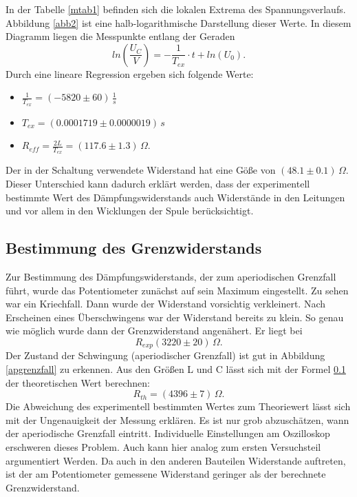 \documentclass[11pt,ngerman,a4paper]{article}
\begin{document}
In der Tabelle \ref{mtab1} befinden sich die lokalen Extrema des Spannungsverlaufs. Abbildung \ref{abb2} ist eine halb-logarithmische Darstellung dieser Werte. In diesem Diagramm liegen die Messpunkte entlang der Geraden
\begin{equation}
ln(\frac{U_C}{V}) = -\frac{1}{T_{ex}}\cdot t + ln(U_0).
\end{equation}
Durch eine lineare Regression ergeben sich folgende Werte:
\begin{itemize}
\item $\frac{1}{T_{ex}} = (-5820\pm60)\,\frac{1}{s}$
\item $T_{ex} = (0.0001719\pm0.0000019)\, s$
\item $R_{eff} = \frac{2L}{T_{ex}} = (117.6\pm1.3)\, \Omega$.
\end{itemize}
Der in der Schaltung verwendete Widerstand hat eine G\"o\ss e von $(48.1 \pm 0.1)\,\Omega$. Dieser Unterschied kann dadurch erkl\"art werden, dass der experimentell bestimmte Wert des D\"ampfungswiderstands auch Widerst\"ande in den Leitungen und vor allem in den Wicklungen der Spule ber\"ucksichtigt.
\subsection{Bestimmung des Grenzwiderstands}

Zur Bestimmung des Dämpfungswiderstands, der zum aperiodischen Grenzfall führt, wurde das Potentiometer zunächst auf sein Maximum eingestellt. Zu sehen war ein Kriechfall. Dann wurde der Widerstand vorsichtig verkleinert. Nach Erscheinen eines Überschwingens war der Widerstand bereits zu klein. So genau wie möglich wurde dann der Grenzwiderstand angenähert. Er liegt bei 
\[
R_{exp}(3220 \pm 20) \, \Omega.
\]
 Der Zustand der Schwingung (aperiodischer Grenzfall) ist gut in Abbildung \ref{apgrenzfall} zu erkennen. Aus den Größen L und C lässt sich mit der Formel \ref{} der theoretischen Wert berechnen:
\[ 
R_{th} = (4396\pm7)\,\Omega.
\]
 Die Abweichung des experimentell bestimmten Wertes zum Theoriewert lässt sich mit der Ungenauigkeit der Messung erklären. Es ist nur grob abzuschätzen, wann der aperiodische Grenzfall eintritt. Individuelle Einstellungen am Oszilloskop erschweren dieses Problem. Auch kann hier analog zum ersten Versuchsteil argumentiert Werden. Da auch in den anderen Bauteilen Widerstande auftreten, ist der am Potentiometer gemessene Widerstand geringer als der berechnete Grenzwiderstand.
\end{document}
